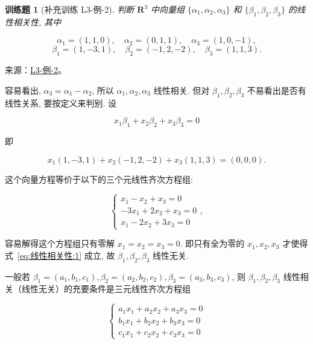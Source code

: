 \documentclass[UTF8,12pt,a4paper,fontset=fandol]{ctexart}
\newtheorem{exercise}{训练题}[section]
\begin{document}
\begin{exercise}[补充训练 L3-例-2]\label{prob:L3-例-2}
判断 $\mathbf{R}^3$ 中向量组 $\{\alpha_1, \alpha_2, \alpha_3\}$ 和 $\{\beta_1, \beta_2, \beta_3\}$ 的线性相关性, 其中

              \[
                  \alpha_1 = (1, 1, 0), \quad \alpha_2 = (0, 1, 1), \quad \alpha_3 = (1, 0, -1),
              \]
              \[
                  \beta_1 = (1, -3, 1), \quad \beta_2 = (-1, 2, -2), \quad \beta_3 = (1, 1, 3).
              \]
\end{exercise}
\noindent 来源：\href{https://github.com/yhwu-is/Linear-Algebra-Left-Undone/blob/new/%E8%AE%B2%E4%B9%89/%E4%B8%93%E9%A2%98/3%20%E6%9C%89%E9%99%90%E7%BB%B4%E7%BA%BF%E6%80%A7%E7%A9%BA%E9%97%B4.tex}{L3-例-2}。
\begin{solve}
容易看出, $\alpha_3 = \alpha_1 - \alpha_2$, 所以 $\alpha_1, \alpha_2, \alpha_3$ 线性相关. 但对 $\beta_1, \beta_2, \beta_3$ 不易看出是否有线性关系, 要按定义来判别. 设

              \begin{equation} \label{eq:线性相关性:1}
                  x_1 \beta_1 + x_2 \beta_2 + x_3 \beta_3 = 0
              \end{equation}

              即

              \[
                  x_1(1, -3, 1) + x_2(-1, 2, -2) + x_3(1, 1, 3) = (0, 0, 0).
              \]

              这个向量方程等价于以下的三个元线性齐次方程组:

              \[
                  \begin{cases}
                      x_1 - x_2 + x_3 = 0    \\
                      -3x_1 + 2x_2 + x_3 = 0 \\
                      x_1 - 2x_2 + 3x_3 = 0
                  \end{cases},
              \]

              容易解得这个方程组只有零解 $x_1 = x_2 = x_3 = 0$. 即只有全为零的 $x_1, x_2, x_3$ 才使得式~\eqref{eq:线性相关性:1} 成立, 故 $\beta_1, \beta_2, \beta_3$ 线性无关.

              一般若 $\beta_1 = (a_1, b_1, c_1), \beta_2 = (a_2, b_2, c_2), \beta_3 = (a_3, b_3, c_3)$, 则 $\beta_1, \beta_2, \beta_3$ 线性相关（线性无关）的充要条件是三元线性齐次方程组

              \[
                  \begin{cases}
                      a_1 x_1 + a_2 x_2 + a_3 x_3 = 0 \\
                      b_1 x_1 + b_2 x_2 + b_3 x_3 = 0 \\
                      c_1 x_1 + c_2 x_2 + c_3 x_3 = 0
                  \end{cases}
              \]


\end{solve}
\end{document}
